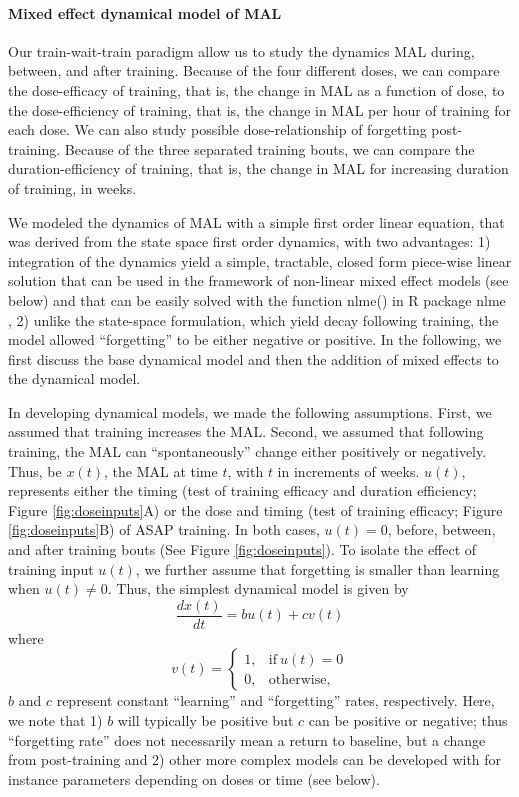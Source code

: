 \paragraph{Mixed effect dynamical model of MAL}
Our train-wait-train paradigm allow us to study the dynamics MAL during, between, and after training. 
Because of the four different doses, we can compare the dose-efficacy of training, that is, the change in MAL as a function of dose, to the dose-efficiency of training, that is, the change in MAL per hour of training for each dose. 
We can also study possible dose-relationship of forgetting post-training. 
Because of the three separated training bouts, we can compare the duration-efficiency of training, that is, the change in MAL for increasing duration of training, in weeks.  

We modeled the dynamics of MAL with a simple first order linear equation, that was derived from the state space first order dynamics, with two advantages: 1) integration of the dynamics yield a simple, tractable, closed form piece-wise linear solution that can be used in the framework of non-linear mixed effect models (see below) and that can be easily solved with the function \textsf{nlme()} in \textsf{R} package \textsf{nlme} \cite{Pinheiro2015}, 2) unlike the state-space formulation, which yield decay following training, the model allowed “forgetting” to be either negative or positive. 
In the following, we first discuss the base dynamical model and then the addition of mixed effects to the dynamical model.

In developing dynamical models, we made the following assumptions. 
First, we assumed that training increases the MAL. 
Second, we assumed that following training, the MAL can “spontaneously” change either positively or negatively. 
Thus, be $ x(t) $, the MAL at time $ t $, with $ t $ in increments of weeks. 
$ u(t) $, represents either the timing (test of training efficacy and duration efficiency; Figure \ref{fig:doseinputs}A) or the dose and timing (test of training efficacy; Figure \ref{fig:doseinputs}B) of ASAP training. 
In both cases, $ u(t) = 0 $, before, between, and after training bouts (See Figure \ref{fig:doseinputs}). 
To isolate the effect of training input $ u(t) $, we further assume that forgetting is smaller than learning when $ u(t) \neq 0 $. 
Thus, the simplest dynamical model is given by
\begin{equation}\label{eqn:finalode}
	\frac{dx(t)}{dt} = bu(t) + cv(t)
\end{equation}
where
\begin{equation}
v(t) = 
\begin{cases}
	1, & \text{if}\ u(t) = 0 \\
	0, & \text{otherwise},
\end{cases}
\end{equation}
$ b $ and $ c $ represent constant “learning” and “forgetting” rates, respectively. 
Here, we note that 1) $ b $ will typically be positive but $ c $ can be positive or negative; thus “forgetting rate” does not necessarily mean a return to baseline, but a change from post-training and 2) other more complex models can be developed with for instance parameters depending on doses or time (see below). 

